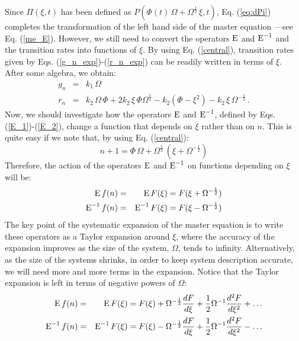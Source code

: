 \smallskip

Since $\Pi(\xi,t)$ has been defined as $P(\Phi(t)\,\Omega + \Omega^{\frac{1}{2}}\,\xi,t)$, Eq. (\ref{eq:dPi}) completes the transformation of the left hand side of the master equation ---see Eq. (\ref{me_E}). However, we still need to convert the operators $\textup{E}$ and $\textup{E}^{-1}$ and the transition rates into functions of $\xi$. By using Eq. (\ref{central}), transition rates given by Eqs. (\ref{g_n_exp})-(\ref{r_n_exp}) can be readily written in terms of $\xi$. After some algebra, we obtain:
\begin{eqnarray}
\label{g_n_Exp}
g_n & = & k_{1}\,\Omega\\
r_n & = & k_{2}\,\Omega\,\Phi+2k_{2}\,\xi\,\Phi\Omega^{\frac{1}{2}}-k_{2}(\Phi-\xi^2) - k_{2}\,\xi\,\Omega^{-\frac{1}{2}}\,. 
\label{r_n_Exp}
\end{eqnarray}
Now, we should investigate how the operators $\textup{E}$ and $\textup{E}^{-1}$, defined by Eqs. (\ref{E_1})-(\ref{E_2}), change a function that depends on $\xi$ rather than on $n$. This is quite easy if we note that, by using Eq. (\ref{central}):
\begin{equation}
n+1 = \Phi\,\Omega + \Omega^{\frac{1}{2}}\,(\xi+\Omega^{-\frac{1}{2}})
\end{equation}
Therefore, the action of the operators $\textup{E}$ and $\textup{E}^{-1}$ on functions depending on $\xi$ will be:
\begin{eqnarray}
\textup{E}\,f(n) &=& \textup{E}\,F(\xi) = F(\xi + \Omega^{-\frac{1}{2}})\\
\textup{E}^{-1}\,f(n) &=& \textup{E}^{-1}\,F(\xi) = F(\xi - \Omega^{-\frac{1}{2}})
\end{eqnarray} 
The key point of the systematic expansion of the master equation is to write these operators as a Taylor expansion around $\xi$, where the accuracy of the expansion improves as the size of the system, $\Omega$, tends to infinity. Alternatively, as the size of the systems shrinks, in order to keep system description accurate, we will need more and more terms in the expansion. Notice that the Taylor expansion is left in terms of negative powers of $\Omega$:
\begin{eqnarray}
\label{E_3}
\textup{E}\,f(n) & = &\textup{E}\,F(\xi) = F(\xi)+\Omega^{-\frac{1}{2}}\frac{dF}{d\xi}+\frac{1}{2}\Omega^{-1}\frac{d^2F}{d\xi^2}+\ldots\\
\textup{E}^{-1}\,f(n) & = &\textup{E}^{-1}\,F(\xi) = F(\xi)-\Omega^{-\frac{1}{2}}\frac{dF}{d\xi}+\frac{1}{2}\Omega^{-1}\frac{d^2F}{d\xi^2}-\ldots
\label{E_4}
\end{eqnarray} 
